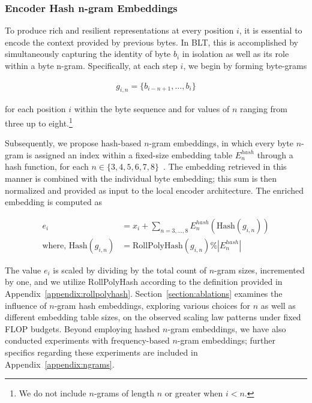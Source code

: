 \subsubsection{Encoder Hash n-gram Embeddings}
\label{sec:ngram-emb}
\label{sec:hash-emb}
To produce rich and resilient representations at every position $i$, it is essential to encode the context provided by previous bytes. In {\textsc BLT}, this is accomplished by simultaneously capturing the identity of byte $b_i$ in isolation as well as its role within a byte n-gram. Specifically, at each step $i$, we begin by forming byte-grams

\begin{align}
    g_{i,n}=\{b_{i-n + 1},\ldots, b_i\}
\end{align}

for each position $i$ within the byte sequence and for values of $n$ ranging from three up to eight.\footnote{We do not include $n$-grams of length $n$ or greater when $i<n$.}

Subsequently, we propose hash-based $n$-gram embeddings, in which every byte $n$-gram is assigned an index within a fixed-size embedding table $E_{n}^{hash}$ through a hash function, for each $n \in\{3,4,5,6,7,8\}$~\citep{bai2010learning}. The embedding retrieved in this manner is combined with the individual byte embedding; this sum is then normalized and provided as input to the local encoder architecture. The enriched embedding is computed as

\begin{align}
e_i &= x_i + \sum_{n = 3,...,8}E_{n}^{hash}(\text{Hash}(g_{i,n})) \\
\text{where, Hash}(g_{i,n}) &= \text{RollPolyHash}(g_{i,n}) \% |E_{n}^{hash}|
\end{align}

The value $e_i$ is scaled by dividing by the total count of $n$-gram sizes, incremented by one, and we utilize RollPolyHash according to the definition provided in Appendix~\ref{appendix:rollpolyhash}. Section~\ref{section:ablations} examines the influence of $n$-gram hash embeddings, exploring various choices for $n$ as well as different embedding table sizes, on the observed scaling law patterns under fixed FLOP budgets. Beyond employing hashed $n$-gram embeddings, we have also conducted experiments with frequency-based $n$-gram embeddings; further specifics regarding these experiments are included in Appendix~\ref{appendix:ngrams}.

